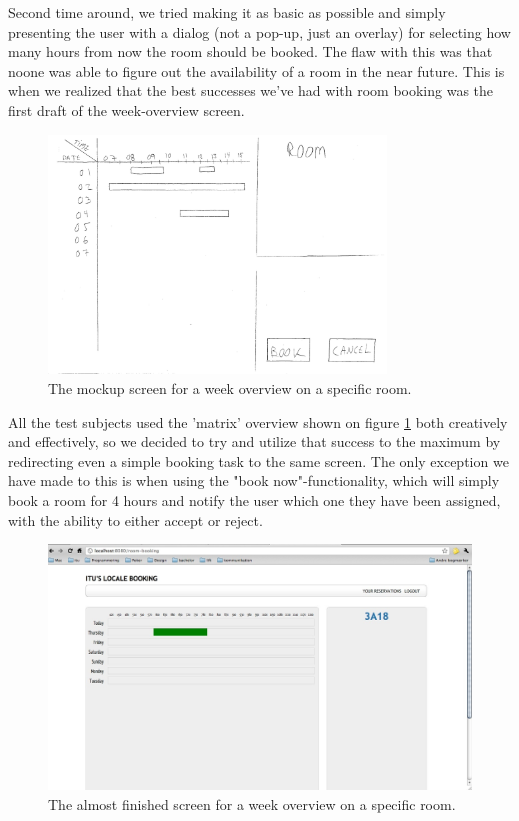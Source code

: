 Second time around, we tried making it as basic as possible and simply presenting the user with a dialog (not a pop-up, just an overlay) for selecting how many hours from now the room should be booked. The flaw with this was that noone was able to figure out the availability of a room in the near future. This is when we realized that the best successes we've had with room booking was the first draft of the week-overview screen.

\begin{figure}[htb]
\begin{center}
\leavevmode
\includegraphics[width=0.8\textwidth]{images/weekMockup}
\end{center}
\caption{The mockup screen for a week overview on a specific room.}
\label{fig:week_mockup}
\end{figure}

All the test subjects used the 'matrix' overview shown on figure \ref{fig:week_mockup} both creatively and effectively, so we decided to try and utilize that success to the maximum by redirecting even a simple booking task to the same screen.
The only exception we have made to this is when using the "book now"-functionality, which will simply book a room for 4 hours and notify the user which one they have been assigned, with the ability to either accept or reject.

\begin{figure}[htb]
\begin{center}
\leavevmode
\includegraphics[width=1\textwidth]{images/weekFinal}
\end{center}
\caption{The almost finished screen for a week overview on a specific room.}
\label{fig:week_final}
\end{figure}

